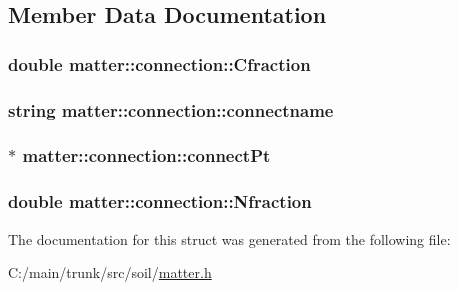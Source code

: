 \subsection{Member Data Documentation}
\hypertarget{structmatter_1_1connection_a1bc64491a187685ab647a630af24f756}{
\subsubsection[{Cfraction}]{\setlength{\rightskip}{0pt plus 5cm}double {\bf matter::connection::Cfraction}}}
\label{structmatter_1_1connection_a1bc64491a187685ab647a630af24f756}
\hypertarget{structmatter_1_1connection_a202dce22f8d21ab024b94df27a795c29}{
\subsubsection[{connectname}]{\setlength{\rightskip}{0pt plus 5cm}string {\bf matter::connection::connectname}}}
\label{structmatter_1_1connection_a202dce22f8d21ab024b94df27a795c29}
\hypertarget{structmatter_1_1connection_a051ef090b207f84e7d354b5b9dc6e8eb}{
\subsubsection[{connectPt}]{$\ast$ {\bf matter::connection::connectPt}}}
\label{structmatter_1_1connection_a051ef090b207f84e7d354b5b9dc6e8eb}
\hypertarget{structmatter_1_1connection_ab9854a021ba6fdecc57b6f5b2cf30db0}{
\subsubsection[{Nfraction}]{\setlength{\rightskip}{0pt plus 5cm}double {\bf matter::connection::Nfraction}}}
\label{structmatter_1_1connection_ab9854a021ba6fdecc57b6f5b2cf30db0}


The documentation for this struct was generated from the following file:\begin{DoxyCompactItemize}
\item 
C:/main/trunk/src/soil/\hyperlink{matter_8h}{matter.h}\end{DoxyCompactItemize}
